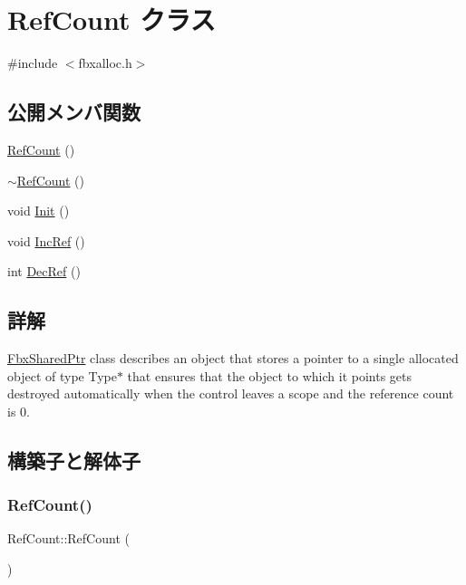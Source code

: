 \hypertarget{class_ref_count}{}\section{Ref\+Count クラス}
\label{class_ref_count}


{\ttfamily \#include $<$fbxalloc.\+h$>$}

\subsection*{公開メンバ関数}
\begin{DoxyCompactItemize}
\item 
\hyperlink{class_ref_count_a871f21de0112bc4ca80b47d81e1be6e4}{Ref\+Count} ()
\item 
\hyperlink{class_ref_count_afa3ff3bce8a9dc9e34ef9c55496c084b}{$\sim$\+Ref\+Count} ()
\item 
void \hyperlink{class_ref_count_af2574bc3b90cd73d040d6bc4b334e2d8}{Init} ()
\item 
void \hyperlink{class_ref_count_abbe1d06e3becee3f3ae61c8d03498a7f}{Inc\+Ref} ()
\item 
int \hyperlink{class_ref_count_a714d52936fdaf707bfc1741942569295}{Dec\+Ref} ()
\end{DoxyCompactItemize}


\subsection{詳解}
\hyperlink{class_fbx_shared_ptr}{Fbx\+Shared\+Ptr} class describes an object that stores a pointer to a single allocated object of type Type$\ast$ that ensures that the object to which it points gets destroyed automatically when the control leaves a scope and the reference count is 0. 

\subsection{構築子と解体子}
\mbox{\label{class_ref_count_a871f21de0112bc4ca80b47d81e1be6e4}} 
\subsubsection{\texorpdfstring{Ref\+Count()}{RefCount()}}
{\footnotesize\ttfamily Ref\+Count\+::\+Ref\+Count (\begin{DoxyParamCaption}{ }\end{DoxyParamCaption})}

